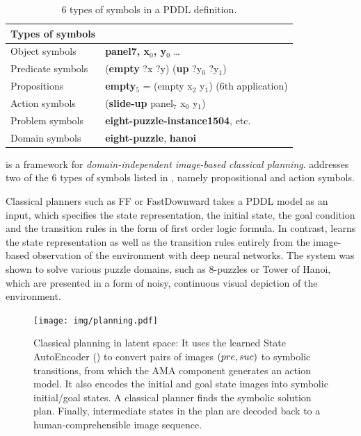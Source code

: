 \begin{table}[tbp] 
\centering
{}
\begin{tabular}{ll}
Types of symbols & \\
\hline
Object symbols    & \textbf{panel7, x\(_{\text{0}}\), y\(_{\text{0}}\)} \ldots{}               \\
Predicate symbols & (\textbf{empty} ?x ?y) (\textbf{up} ?y\(_{\text{0}}\) ?y\(_{\text{1}}\))   \\
Propositions      & \textbf{empty\(_{\text{5}}\)} = (empty x\(_{\text{2}}\) y\(_{\text{1}}\)) (6th application) \\
Action symbols    & (\textbf{slide-up} panel\(_{\text{7}}\) x\(_{\text{0}}\) y\(_{\text{1}}\)) \\
Problem symbols   & \textbf{eight-puzzle-instance1504}, etc.                                   \\
Domain  symbols   & \textbf{eight-puzzle}, \textbf{hanoi}                                      \\
\hline
\end{tabular}
\caption{6 types of symbols in a PDDL definition.}
\label{tab:type-of-symbols}
\end{table}

\textbf{\latentplanner} \cite{Asai2018} is a framework for
\emph{domain-independent image-based classical planning}.
\latentplanner addresses two of the 6 types of symbols listed in ,
namely propositional and action symbols.

Classical planners such as FF \cite{hoffmann01} or
FastDownward \cite{Helmert04} takes a PDDL model as an input, which
specifies the state representation, the initial state, the goal
condition and the transition rules in the form of first order logic
formula.  In contrast, \latentplanner learns the state representation as well as the transition rules
entirely from the image-based observation of the environment with deep neural networks.
The system was shown to solve various puzzle domains, such as 8-puzzles or Tower of Hanoi,
which are presented in a form of noisy, continuous visual depiction of the environment.

\begin{figure}[htb]
 \centering
 \texttt{[image: img/planning.pdf]}
 \caption{Classical planning in latent space:
It uses the learned State AutoEncoder () to convert pairs of images $(pre,suc)$ to symbolic transitions, from which the AMA component generates an action model.
It also encodes the initial and goal state images into symbolic initial/goal states.
A classical planner finds the symbolic solution plan.
Finally, intermediate states in the plan are decoded back to a human-comprehensible image sequence.}
\label{fig:overview}
\end{figure}

